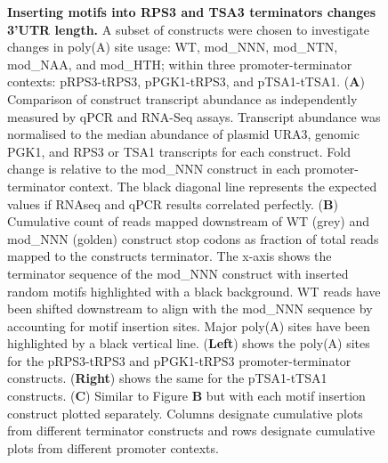 \documentclass{SBCbookchapter}
\begin{document}
\begin{figure}[p]
\caption{\textbf{Inserting motifs into RPS3 and TSA3 terminators changes 3'UTR length.} A subset of constructs were chosen to investigate changes in poly(A) site usage: WT, mod\_NNN, mod\_NTN, mod\_NAA, and mod\_HTH; within three promoter-terminator contexts: pRPS3-tRPS3, pPGK1-tRPS3, and pTSA1-tTSA1. (\textbf{A}) Comparison of construct transcript abundance as independently measured by qPCR and RNA-Seq assays. Transcript abundance was normalised to the median abundance of  plasmid URA3, genomic PGK1, and RPS3 or TSA1 transcripts for each construct. Fold change is relative to the mod\_NNN construct in each promoter-terminator context. The black diagonal line represents the expected values if RNAseq and qPCR results correlated perfectly. (\textbf{B}) Cumulative count of reads mapped downstream of WT (grey) and mod\_NNN (golden) construct stop codons as fraction of total reads mapped to the constructs terminator. The x-axis shows the terminator sequence of the mod\_NNN construct with inserted random motifs highlighted with a black background. WT reads have been shifted downstream to align with the mod\_NNN sequence by accounting for motif insertion sites. Major poly(A) sites have been highlighted by a black vertical line. (\textbf{Left}) shows the poly(A) sites for the pRPS3-tRPS3 and pPGK1-tRPS3 promoter-terminator constructs. (\textbf{Right}) shows the same for the pTSA1-tTSA1 constructs. (\textbf{C}) Similar to Figure \textbf{B} but with each motif insertion construct plotted separately. Columns designate cumulative plots from different terminator constructs and rows designate cumulative plots from different promoter contexts.}\label{fig:quantseq-polyA-site-usage}
\end{figure}
\end{document}
